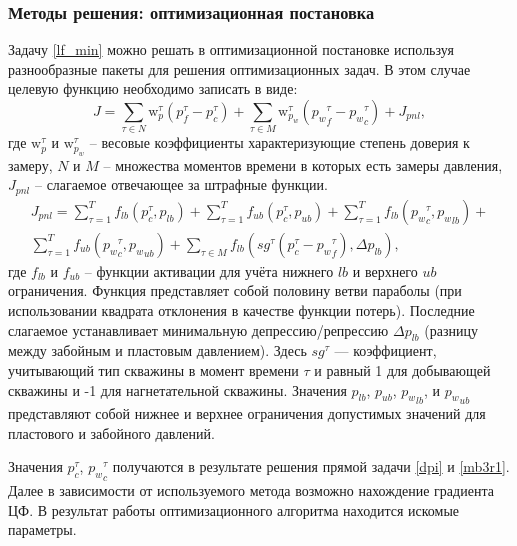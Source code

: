 \documentclass[14pt]{article}
\begin{document}
\subsubsection{Методы решения: оптимизационная постановка}
Задачу \ref{lf_min} можно решать в оптимизационной постановке используя разнообразные пакеты для решения оптимизационных задач. В этом случае целевую функцию необходимо записать в виде:
\begin{equation}\label{Jlf_min}
	J = \sum_{ \tau \in N}\mathrm{w}_p^{\tau}\left(p^{\tau}_f - p^{\tau}_c \right) +
	\sum_{ \tau \in M}\mathrm{w}_{p_w}^{\tau}\left({p_w}^{\tau}_f - {p_w}^{\tau}_c \right) +  
	J_{pnl},
\end{equation}
где $\mathrm{w}_p^{\tau}$ и $\mathrm{w}_{p_w}^{\tau}$ -- весовые коэффициенты характеризующие степень доверия к замеру, $N$ и $M$ -- множества моментов времени в которых есть замеры давления, $J_{pnl}$ -- слагаемое отвечающее за штрафные функции.
\begin{equation}\label{Jpnl}
	\begin{split}
	J_{pnl} = \sum_{\tau = 1}^{T}f_{lb}(p^{\tau}_c, p_{lb}) +
			   \sum_{\tau = 1}^{T}f_{ub}(p^{\tau}_c, p_{ub}) + 
			   \sum_{\tau = 1}^{T}f_{lb}({p_w}^{\tau}_c, {p_w}_{lb}) + \\
			   \sum_{\tau = 1}^{T}f_{ub}({p_w}^{\tau}_c, {p_w}_{ub}) +  
			   \sum_{\tau \in M}f_{lb}\left(sg^{\tau} \left(p^{\tau}_c - {p_w}^{\tau}_f \right), \Delta p_{lb}\right),
	\end{split}
\end{equation}
где $f_{lb}$ и $f_{ub}$ -- функции активации для учёта нижнего $lb$ и верхнего $ub$ ограничения. Функция представляет собой половину ветви параболы (при использовании квадрата отклонения в качестве функции потерь). Последние слагаемое устанавливает минимальную депрессию/репрессию $\Delta p_{lb}$ (разницу между забойным и пластовым давлением). Здесь $sg^{\tau}$ — коэффициент, учитывающий тип скважины в момент времени $\tau$ и равный 1 для добывающей скважины и -1 для нагнетательной скважины. Значения $p_{lb}$, $p_{ub}$, ${p_w}_{lb}$, и ${p_w}_{ub}$ представляют собой нижнее и верхнее ограничения допустимых значений для пластового и забойного давлений.

Значения $p^{\tau}_c$, ${p_w}^{\tau}_c$ получаются в результате решения прямой задачи \ref{dpi} и \ref{mb3r1}. Далее в зависимости от используемого метода возможно нахождение градиента ЦФ. В результат работы оптимизационного алгоритма находится искомые параметры. 
\end{document}
